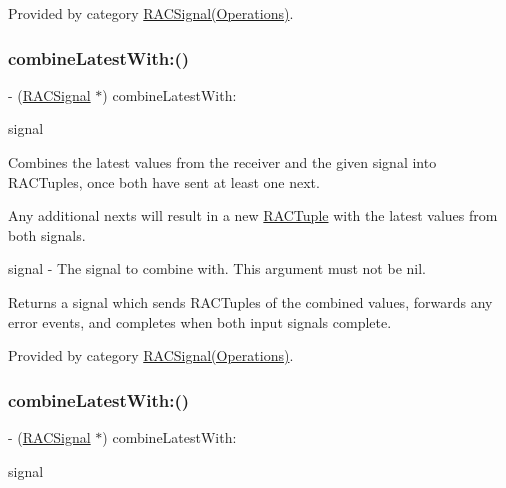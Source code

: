 Provided by category \mbox{\hyperlink{category_r_a_c_signal_07_operations_08_a5e4d2db914a14c415646d9fdda131221}{R\+A\+C\+Signal(\+Operations)}}.

\mbox{\label{interface_r_a_c_signal_afab1b19558df566351cf87e466a5022f}} 
\subsubsection{\texorpdfstring{combine\+Latest\+With\+:()}{combineLatestWith:()}\hspace{0.1cm}{\footnotesize\ttfamily [1/3]}}
{\footnotesize\ttfamily -\/ (\mbox{\hyperlink{interface_r_a_c_signal}{R\+A\+C\+Signal}} $\ast$) combine\+Latest\+With\+: \begin{DoxyParamCaption}\item[{(\mbox{\hyperlink{interface_r_a_c_signal}{R\+A\+C\+Signal}} $\ast$)}]{signal }\end{DoxyParamCaption}}

Combines the latest values from the receiver and the given signal into R\+A\+C\+Tuples, once both have sent at least one {\ttfamily next}.

Any additional {\ttfamily next}s will result in a new \mbox{\hyperlink{interface_r_a_c_tuple}{R\+A\+C\+Tuple}} with the latest values from both signals.

signal -\/ The signal to combine with. This argument must not be nil.

Returns a signal which sends R\+A\+C\+Tuples of the combined values, forwards any {\ttfamily error} events, and completes when both input signals complete. 

Provided by category \mbox{\hyperlink{category_r_a_c_signal_07_operations_08_afab1b19558df566351cf87e466a5022f}{R\+A\+C\+Signal(\+Operations)}}.

\mbox{\label{interface_r_a_c_signal_afab1b19558df566351cf87e466a5022f}} 
\subsubsection{\texorpdfstring{combine\+Latest\+With\+:()}{combineLatestWith:()}\hspace{0.1cm}{\footnotesize\ttfamily [2/3]}}
{\footnotesize\ttfamily -\/ (\mbox{\hyperlink{interface_r_a_c_signal}{R\+A\+C\+Signal}} $\ast$) combine\+Latest\+With\+: \begin{DoxyParamCaption}\item[{(\mbox{\hyperlink{interface_r_a_c_signal}{R\+A\+C\+Signal}} $\ast$)}]{signal }\end{DoxyParamCaption}}

